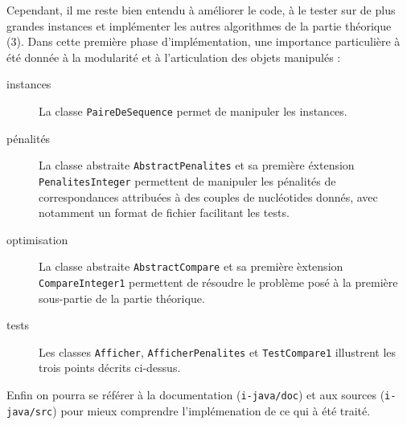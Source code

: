 Cependant, il me reste bien entendu \`a am\'eliorer le code, \`a le
tester sur de plus grandes instances et impl\'ementer les autres
algorithmes de la partie th\'eorique (3).  \newpage Dans cette
premi\`ere phase d'impl\'ementation, une importance particuli\`ere \`a
\'et\'e donn\'ee \`a la modularit\'e et \`a l'articulation des objets
manipul\'es :
\begin{description}
\item[instances] La classe \verb'PaireDeSequence' permet de manipuler
  les instances.
\item[p\'enalit\'es] La classe abstraite \verb'AbstractPenalites' et
  sa premi\`ere \'extension \verb'PenalitesInteger' permettent de
  manipuler les p\'enalit\'es de correspondances attribu\'ees \`a des
  couples de nucl\'eotides donn\'es, avec notamment un format de
  fichier facilitant les tests.
\item[optimisation] La classe abstraite \verb'AbstractCompare' et sa
  premi\`ere \`extension \verb'CompareInteger1' permettent de
  r\'esoudre le probl\`eme pos\'e \`a la premi\`ere sous-partie de la
  partie th\'eorique.
\item[tests] Les classes \verb'Afficher', \verb'AfficherPenalites' et
  \verb'TestCompare1' illustrent les trois points d\'ecrits ci-dessus.
\end{description}
Enfin on pourra se r\'ef\'erer \`a la documentation
(\verb'i-java/doc') et aux sources (\verb'i-java/src') pour mieux
comprendre l'impl\'emenation de ce qui \`a \'et\'e trait\'e.
